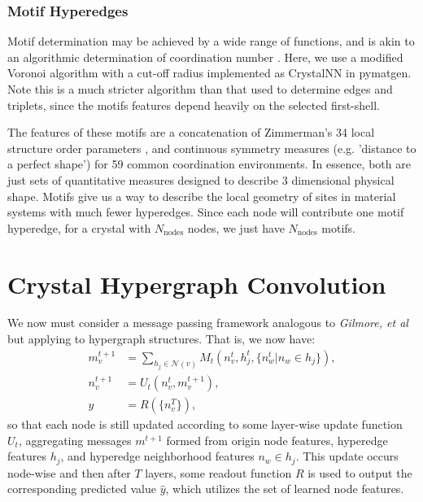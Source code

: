\documentclass[twoside,twocolumn,9pt]{article}
\begin{document}






\subsubsection{Motif Hyperedges}
Motif determination may be achieved by a wide range of functions, and is akin to an algorithmic determination of coordination number \cite{coordination_comp}. Here, we use a modified Voronoi algorithm with a cut-off radius implemented as CrystalNN in pymatgen.
Note this is a much stricter algorithm than that used to determine edges and triplets, since the motifs features depend heavily on the selected first-shell.

The features of these motifs are a concatenation of Zimmerman's 34 local structure order parameters \cite{orderparam1,orderparam2}, and continuous symmetry measures \cite{csm_polyhedra} (e.g. 'distance to a perfect shape') for 59 common coordination environments. In essence, both are just sets of quantitative measures designed to describe 3 dimensional physical shape. 
Motifs give us a way to describe the local geometry of sites in material systems with much fewer hyperedges. Since each node will contribute one motif hyperedge, for a crystal with $N_{\text{nodes}}$ nodes, we just have $N_{\text{nodes}}$ motifs. 


\section{Crystal Hypergraph Convolution}

We now must consider a message passing framework analogous to \textit{Gilmore, et al} \cite{mpnn} but applying to hypergraph structures. That is, we now have:
\begin{align*}
	m_v^{t+1}&=\sum_{h_j\in \mathcal{N}(v)} M_t(n_v^{t},h_j^{t},\lbrace n_w^t \vert n_w \in h_j \rbrace),\\
	n_v^{t+1}&=U_t(n_v^t,m_v^{t+1}),\\
	\hat{y}&=R(\lbrace n_v^T\rbrace),
\end{align*}
so that each node is still updated according to some layer-wise update function $U_t$, aggregating messages $m^{t+1}$ formed from origin node features, hyperedge features $h_j$, and hyperedge neighborhood features $n_w \in h_j$. This update occurs node-wise and then after $T$ layers, some readout function $R$ is used to output the corresponding predicted value $\hat{y}$, which utilizes the set of learned node features.
\end{document}
